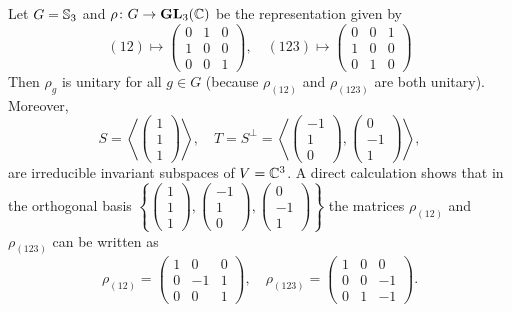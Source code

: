\begin{example}
    Let $G=\mathbb{S}_3$ and $\rho\colon G\to\mathbf{GL}_3(\mathbb{C})$ be the representation given by
    \[
    (12)\mapsto\begin{pmatrix}
    0&1&0\\
    1&0&0\\
    0&0&1
    \end{pmatrix},\quad
    (123)\mapsto\begin{pmatrix}
    0&0&1\\
    1&0&0\\
    0&1&0
    \end{pmatrix}
    \]
    Then $\rho_g$ is unitary for all $g\in G$ (because $\rho_{(12)}$ and $\rho_{(123)}$ are both
    unitary). Moreover,
    \[
    S=\left\langle \begin{pmatrix}
    1\\1\\1
    \end{pmatrix}
    \right\rangle,
    \quad
    T=S^{\perp}=\left\langle
    \begin{pmatrix}
    -1\\1\\0
    \end{pmatrix},
    \begin{pmatrix}
    0\\-1\\1
    \end{pmatrix}
    \right\rangle,
    \]
    are irreducible invariant subspaces of $V=\mathbb{C}^3$. A direct calculation shows that
    in the orthogonal basis $\left\{\begin{pmatrix}
    1\\1\\1
    \end{pmatrix},
    \begin{pmatrix}
    -1\\1\\0
    \end{pmatrix},
    \begin{pmatrix}
    0\\-1\\1
    \end{pmatrix}
    \right\}$
    the matrices $\rho_{(12)}$ and $\rho_{(123)}$ can be written as
    \[
    \rho_{(12)}=\begin{pmatrix}
        1&0&0\\
        0&-1&1\\
        0&0&1
    \end{pmatrix},
    \quad
    \rho_{(123)}=
    \begin{pmatrix}
        1&0&0\\
        0&0&-1\\
        0&1&-1
    \end{pmatrix}.
    \]
\end{example}

